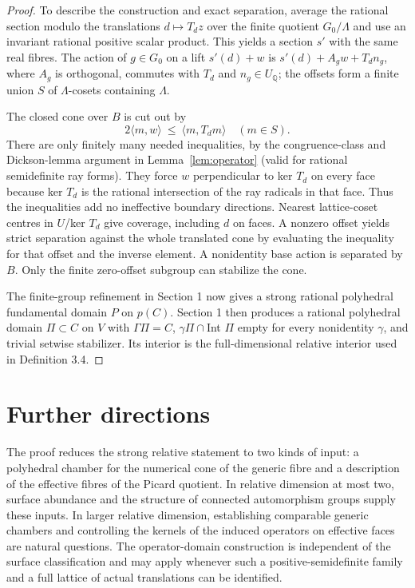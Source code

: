 \documentclass[11pt]{article}
\begin{document}
\begin{proof}
To describe the construction and exact separation, average the rational section modulo the translations
\(d\mapsto T_dz\) over the finite quotient \(G_0/\Lambda\) and use an invariant rational
positive scalar product. This yields a section \(s'\) with the same real fibres. The action of
\(g\in G_0\) on a lift \(s'(d)+w\) is \(s'(d)+A_gw+T_dn_g\), where \(A_g\) is
orthogonal, commutes with \(T_d\) and \(n_g\in U_{\mathbb Q}\); the offsets form a finite union \(S\) of
\(\Lambda\)-cosets containing \(\Lambda\).

The closed cone over \(B\) is cut out by \[
 2\langle m,w\rangle\ \le\ \langle m,T_dm\rangle \quad (m\in S).
\] There are only finitely many needed inequalities, by the congruence-class and Dickson-lemma argument in Lemma~\ref{lem:operator} (valid for rational semidefinite ray forms). They force \(w\) perpendicular to ker \(T_d\) on every face because ker \(T_d\) is the rational intersection of the ray radicals in that face. Thus the inequalities add no ineffective boundary directions. Nearest lattice-coset centres in \(U\)/ker \(T_d\) give coverage, including \(d\) on faces. A nonzero offset yields strict separation against the whole translated cone by evaluating the inequality for that offset and the inverse element. A nonidentity base action is separated by \(B\). Only the finite zero-offset subgroup can stabilize the cone.

The finite-group refinement in Section 1 now gives a strong rational polyhedral fundamental domain \(P\)
on \(p(C)\). Section 1 then produces a rational polyhedral domain \(\Pi\subset C\) on \(V\) with
\(\Gamma\Pi=C\), \(\gamma\Pi\cap\)Int \(\Pi\) empty for every nonidentity \(\gamma\), and trivial
setwise stabilizer. Its interior is the full-dimensional relative interior used in Definition 3.4.
\end{proof}

\section*{Further directions}
The proof reduces the strong relative statement to two kinds of input: a
polyhedral chamber for the numerical cone of the generic fibre and a description
of the effective fibres of the Picard quotient. In relative dimension at most two,
surface abundance and the structure of connected automorphism groups supply
these inputs. In larger relative dimension, establishing comparable generic
chambers and controlling the kernels of the induced operators on effective
faces are natural questions. The operator-domain construction is independent of
the surface classification and may apply whenever such a positive-semidefinite
family and a full lattice of actual translations can be identified.
\end{document}
